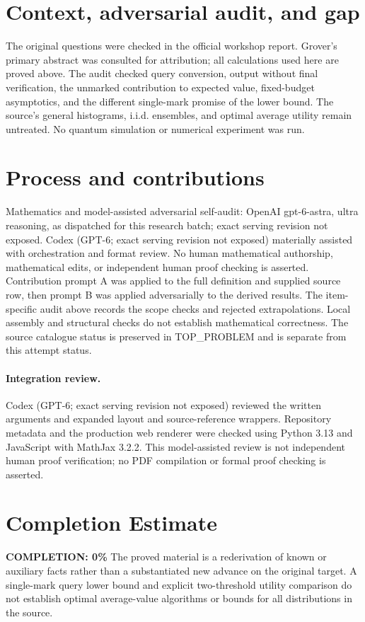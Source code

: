 \documentclass[11pt]{article}
\begin{document}
\section{Context, adversarial audit, and gap}
The original questions were checked in the official workshop report. Grover's
primary abstract was consulted for attribution; all calculations used here
are proved above. The audit checked query conversion, output without final
verification, the unmarked contribution to expected value, fixed-budget
asymptotics, and the different single-mark promise of the lower bound. The
source's general histograms, i.i.d. ensembles, and optimal average utility
remain untreated. No quantum simulation or numerical experiment was run.

\section{Process and contributions}
Mathematics and model-assisted adversarial self-audit: OpenAI gpt-6-astra, ultra reasoning, as dispatched for this research batch; exact serving revision not exposed. Codex (GPT-6; exact serving revision not exposed) materially assisted with orchestration and format review. No human mathematical authorship, mathematical edits, or independent human proof checking is asserted.
Contribution prompt A was applied to the full definition and supplied source row, then prompt B was applied adversarially to the derived results. The item-specific audit above records the scope checks and rejected extrapolations. Local assembly and structural checks do not establish mathematical correctness. The source catalogue status is preserved in TOP\_PROBLEM and is separate from this attempt status.
\paragraph{Integration review.} Codex (GPT-6; exact serving revision not exposed) reviewed the written arguments and expanded layout and source-reference wrappers. Repository metadata and the production web renderer were checked using Python 3.13 and JavaScript with MathJax 3.2.2. This model-assisted review is not independent human proof verification; no PDF compilation or formal proof checking is asserted.

\section{Completion Estimate}
\noindent\textbf{COMPLETION: 0\%}
The proved material is a rederivation of known or auxiliary facts rather than a substantiated new advance on the original target. A single-mark query lower bound and explicit two-threshold utility comparison do not establish optimal average-value algorithms or bounds for all distributions in the source.
\end{document}
